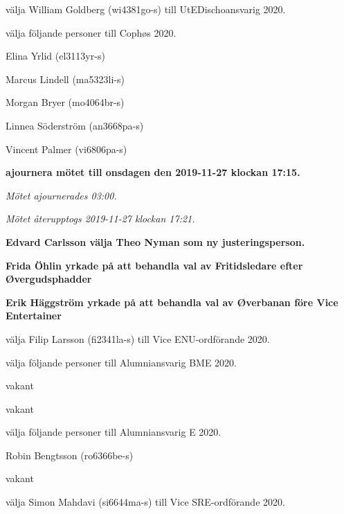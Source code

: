 \documentclass[10pt]{article}
\begin{document}
\begin{paragrafer}
\begin{paralist}

    \Mba välja William Goldberg (wi4381go-s) till UtEDischoansvarig 2020. 

    \Mba välja följande personer till Cophøs 2020.
    \begin{tightdashlist}
        \item Elina Yrlid (el3113yr-s)
        \item Marcus Lindell (ma5323li-s)
        \item Morgan Bryer (mo4064br-s)
        \item Linnea Söderström (an3668pa-s)
        \item Vincent Palmer (vi6806pa-s)
    \end{tightdashlist}

    \textbf{\Mba ajournera mötet till onsdagen den 2019-11-27 klockan 17:15.}
    
    \emph{Mötet ajournerades 03:00.}

    \emph{Mötet återupptogs 2019-11-27 klockan 17:21.}

    \textbf{Edvard Carlsson \ypa välja Theo Nyman som ny justeringsperson.}

    \textbf{\Mbaby}

    \textbf{Frida Öhlin yrkade på att behandla val av Fritidsledare efter Øvergudsphadder}

    \textbf{\Mbaby}

    \textbf{Erik Häggström yrkade på att behandla val av Øverbanan före Vice Entertainer}

    \textbf{\Mbaby}

    \Mba välja Filip Larsson (fi2341la-s) till Vice ENU-ordförande 2020.
    
    \Mba välja följande personer till Alumniansvarig BME 2020.
    \begin{tightdashlist}
        \item vakant
        \item vakant
    \end{tightdashlist}

    \Mba välja följande personer till Alumniansvarig E 2020.
    \begin{tightdashlist}
        \item Robin Bengtsson (ro6366be-s)
        \item vakant
    \end{tightdashlist}

    \Mba välja Simon Mahdavi (si6644ma-s) till Vice SRE-ordförande 2020.


\end{paralist}
\end{paragrafer}
\end{document}
